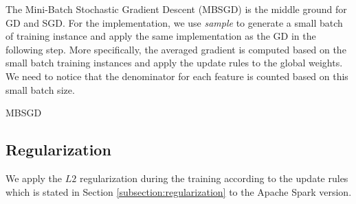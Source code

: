 \documentclass[sigconf]{acmart}
\makeatletter
\def\BState{\State\hskip-\ALG@thistlm}
\makeatother
\begin{document}
The Mini-Batch Stochastic Gradient Descent (MBSGD) is the middle ground for GD and SGD. For the implementation, we use \textit{sample} to generate a small batch of training instance and apply the same implementation as the GD in the following step. More specifically, the averaged gradient is computed based on the small batch training instances and apply the update rules to the global weights. We need to notice that the denominator for each feature is counted based on this small batch size. 

\begin{algorithm}
\caption{MBSGD}\label{MBSGD}
\end{algorithm}

\subsection{Regularization}
We apply the $L2$ regularization during the training according to the update rules which is stated in Section \ref{subsection:regularization} to the Apache Spark version. 
\end{document}
